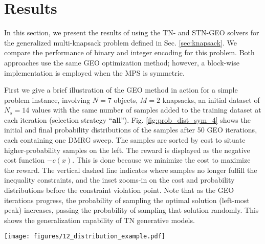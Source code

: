 \section{Results}\label{sec:results}

In this section, we present the results of using the TN- and STN-GEO solvers for the generalized multi-knapsack problem defined in Sec. \ref{sec:knapsack}. We compare the performance of binary and integer encoding for this problem. Both approaches use the same GEO optimization method; however, a block-wise implementation is employed when the MPS is symmetric. 

First we give a brief illustration of the GEO method in action for a simple problem instance, involving $N=7$ objects, $M=2$ knapsacks, an initial dataset of $N_s=14$ values with the same number of samples added to the training dataset at each iteration (selection strategy ``\textbf{all}''). Fig. \ref{fig:prob_dist_sym_4} shows the initial and final probability distributions of the samples after 50 GEO iterations, each containing one DMRG sweep. The samples are sorted by cost to situate higher-probability samples on the left. The reward is displayed as the negative cost function $-c(x)$.
This is done because we minimize the cost to maximize the reward. The vertical dashed line indicates where samples no longer fulfill the inequality constraints, and the inset zooms-in on the cost and probability distributions before the constraint violation point. Note that as the GEO iterations progress, the probability of sampling the optimal solution (left-most peak) increases, passing the probability of sampling that solution randomly. This shows the generalization capability of TN generative models.

\begin{figure*}[!htbp]
    \centering
    \texttt{[image: figures/12\_distribution\_example.pdf]}
    \caption{This figure illustrates the optimization outcomes for a problem instance involving $2$ knapsacks and $7$ objects, resulting in a sample space of size $2^7=128$. Samples on the x-axis are sorted in decreasing order of the negative cost function $-c(x)$, shown as blue line. The gray distribution represents the probability of each sample generated from a randomly initialized MPS using integer encoding. After performing $50$ iterations of the GEO optimization algorithm, the green distribution shows the updated probabilities from the optimized MPS. The dashed horizontal black line indicates the probability of selecting a sample from a uniform distribution ($1/128$).
    The red vertical dashed line separates valid samples (fulfilling the inequality constraint) on the left from invalid samples on the right. The cost of valid samples looks like a flat line due to the scaling of the penalty, so the inset provides insight into the actual difference.}
    \label{fig:prob_dist_sym_4}
\end{figure*}

